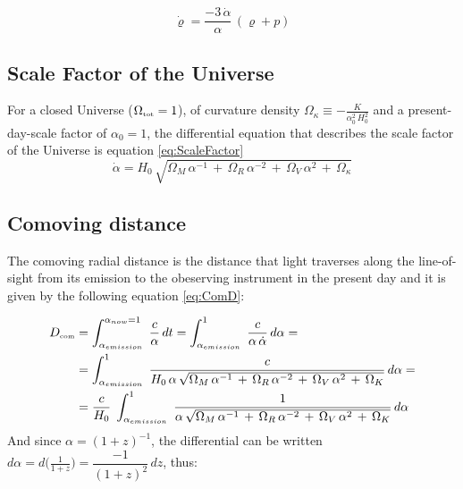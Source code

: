 \begin{equation} 
 \dot{\varrho} = \dfrac{-3\,\dot{\alpha}}{\alpha}\,(\varrho+p)
\label{eq:Klein} 
\end{equation} 
\subsection{Scale Factor of the Universe}
For a closed Universe ($\Omega_{\mbox{\tiny{tot}}}=1$), of curvature density $\Omega_\kappa \equiv - \frac{K}{\alpha_0^2\, H_0^2}$ and a present-day-scale factor of $\alpha_0 = 1$\cite{CosmoWein}, the differential equation that describes the scale factor of the Universe is equation \ref{eq:ScaleFactor}  
\begin{equation} 
  \dot{\alpha} = H_0 \, \sqrt{ \Omega_M\, \alpha^{-1} \,+\, \Omega_R\, \alpha^{-2} \,+\, \Omega_V\, \alpha^{2}\,+\, \Omega_\kappa  }
\label{eq:ScaleFactor} 
\end{equation} 

\subsection{Comoving distance} \label{sec:Cosmo-ComovD}
The comoving radial distance is the distance that light traverses along the line-of-sight from its emission to the obeserving instrument in the present day and it is given by the following equation \ref{eq:ComD}:

\begin{equation} \begin{aligned} 
D_{\mbox{\tiny{com}}} &  =  \int_{\alpha_{emission}}^{\alpha_{now} = 1}\;  \dfrac{c}{\alpha}\,dt = \int_{\alpha_{emission}}^{1}\;  \dfrac{c}{\alpha\, \dot{\alpha}}\,d\alpha =   \\ & =   \int_{\alpha_{emission}}^{1}\;  \dfrac{c}{ H_0 \,\alpha\, \sqrt{ \Omega_M\, \alpha^{-1} \,+\, \Omega_R\, \alpha^{-2} \,+\, \Omega_V\, \alpha^{2}\,+\, \Omega_K  }  }  \,d\alpha =   \\ & =   \dfrac{c}{H_0}\; \int_{\alpha_{emission}}^{1}\;  \dfrac{1}{ \alpha\, \sqrt{ \Omega_M\, \alpha^{-1} \,+\, \Omega_R\, \alpha^{-2} \,+\, \Omega_V\, \alpha^{2}\,+\, \Omega_K  }  }  \,d\alpha
\end{aligned} \end{equation}
 And since $\alpha = (1+z)^{-1}$, the differential can be written $d\alpha = d \big( \frac{1}{1+z} \big) = \dfrac{-1}{(1+z)^2} \,dz $, thus:    
 
